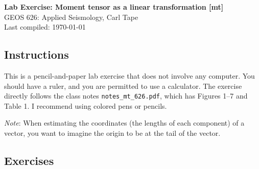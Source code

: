 \documentclass[11pt,titlepage,fleqn]{article}
\newcommand{\mtfile}{\texttt{notes\_mt\_626.pdf}}
\begin{document}

\begin{spacing}{1.2}
\centering
{\large \bf Lab Exercise: Moment tensor as a linear transformation [mt]} \\
GEOS 626: Applied Seismology, Carl Tape \\
Last compiled: \today
\end{spacing}


\subsection*{Instructions}

This is a pencil-and-paper lab exercise that does not involve any computer. You should have a ruler, and you are permitted to use a calculator. The exercise directly follows the class notes \mtfile, which has Figures 1--7 and Table 1. I recommend using colored pens or pencils.

\medskip\noindent
{\em Note}: When estimating the coordinates (\ie the lengths of each component) of a vector, you want to imagine the origin to be at the tail of the vector. 


\subsection*{Exercises}
\end{document}
